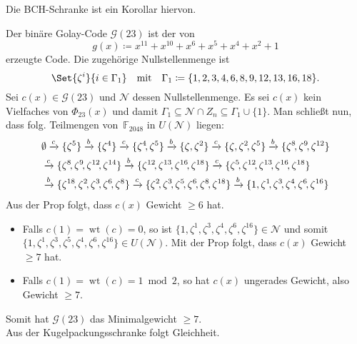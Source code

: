 \documentclass{cheat-sheet}
\newcommand{\F}{\mathbb{F}} %
\DeclareMathOperator{\wt}{wt} %
\newcommand{\Golay}{\mathcal{G}} %
\begin{document}
\begin{bem}
  Die BCH-Schranke ist ein Korollar hiervon.
\end{bem}

\begin{bsp}
  Der binäre Golay-Code $\Golay(23)$ ist der von
  \[
    g(x) \coloneqq x^{11} + x^{10} + x^6 + x^5 + x^4 + x^2 + 1
  \]
  erzeugte Code.
  Die zugehörige Nullstellenmenge ist
  \[
    \Set{\zeta^i}{i \in \Gamma_1}
    \quad \text{mit} \quad
    \Gamma_1 \coloneqq \{ 1, 2, 3, 4, 6, 8, 9, 12, 13, 16, 18 \}.
  \]
  Sei $c(x) \in \Golay(23)$ und $\mathcal{N}$ dessen Nullstellenmenge.
  Es sei $c(x)$ kein Vielfaches von $\Phi_{23}(x)$ und damit $\Gamma_1 \subseteq \mathcal{N} \cap Z_n \subseteq \Gamma_1 \cup \{ 1 \}$.
  Man schließt nun, dass folg. Teilmengen von~$\F_{2048}$ in $U(\mathcal{N})$ liegen:
  \begin{align*}
    & \emptyset
    \xra{c}
    \{ \zeta^5 \}
    \xra{b}
    \{ \zeta^4 \}
    \xra{c}
    \{ \zeta^4\!, \zeta^5 \}
    \xra{b}
    \{ \zeta, \zeta^2 \}
    \xra{c}
    \{ \zeta, \zeta^2\!, \zeta^5 \}
    \xra{b}
    \{ \zeta^8\!, \zeta^9\!, \zeta^{12} \} \\
    & \xra{c}
    \{ \zeta^8\!, \zeta^9\!, \zeta^{12}\!, \zeta^{14} \}
    \xra{b}
    \{ \zeta^{12}\!, \zeta^{13}\!, \zeta^{16}\!, \zeta^{18} \}
    \xra{c}
    \{ \zeta^5\!, \zeta^{12}\!, \zeta^{13}\!, \zeta^{16}\!, \zeta^{18} \} \\
    & \xra{b}
    \{ \zeta^{18}\!, \zeta^2\!, \zeta^3\!, \zeta^6\!, \zeta^8 \}
    \xra{c}
    \{ \zeta^2\!, \zeta^3\!, \zeta^5\!, \zeta^6\!, \zeta^8\!, \zeta^{18} \}
    \xra{b}
    \{ 1, \zeta^1\!, \zeta^3\!, \zeta^4\!, \zeta^6\!, \zeta^{16} \}
  \end{align*}
  Aus der Prop folgt, dass $c(x)$ Gewicht $\geq 6$ hat.
  \begin{itemize}
    \item Falls $c(1) = \wt(c) = 0$, so ist $\{ 1, \zeta^1, \zeta^3, \zeta^4, \zeta^6, \zeta^{16} \} \in \mathcal{N}$ und somit $\{ 1, \zeta^1, \zeta^3, \zeta^5, \zeta^4, \zeta^6, \zeta^{16} \} \in U(\mathcal{N})$.
    Mit der Prop folgt, dass $c(x)$ Gewicht $\geq 7$ hat.
    \item Falls $c(1) = \wt(c) = 1 \bmod{2}$, so hat $c(x)$ ungerades Gewicht, also Gewicht $\geq 7$.
  \end{itemize}
  Somit hat $\Golay(23)$ das Minimalgewicht $\geq 7$. \\
  Aus der Kugelpackungsschranke folgt Gleichheit.
\end{bsp}
\end{document}
